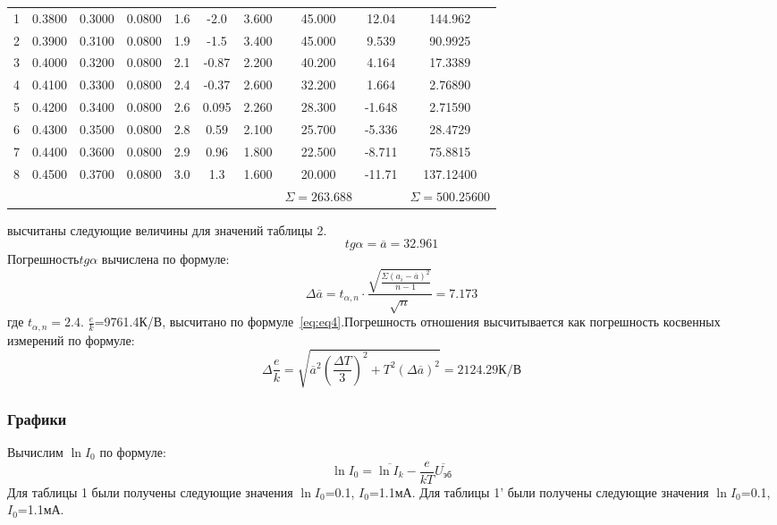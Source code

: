 \begin{center}
\begin{table}[H]
\begin{tabular}{|c|c|c|c|c|c|c|c|c|c|}
\begin{minipage}{21mm}
\end{minipage}\\
\hline
1 &  0.3800  &  0.3000  & 0.0800 & 1.6& -2.0&3.600 & 45.000 &12.04 & 144.962\\
2 &  0.3900  &  0.3100  &  0.0800 & 1.9& -1.5&3.400 &45.000 &9.539 &90.9925\\
3 &  0.4000  &  0.3200  & 0.0800  & 2.1& -0.87&2.200 &40.200 &4.164 &17.3389\\
4 & 0.4100  &  0.3300 &  0.0800 & 2.4& -0.37&2.600  &32.200 &1.664 &2.76890\\
5 & 0.4200  &  0.3400  &  0.0800 &  2.6&0.095 &2.260 &28.300 &-1.648 &2.71590  \\
6 & 0.4300  &  0.3500  &  0.0800 & 2.8&0.59 &2.100 &25.700 &-5.336 &28.4729 \\
7 & 0.4400  &  0.3600  &  0.0800 & 2.9&0.96 &1.800 &22.500 &-8.711 & 75.8815 \\
8 & 0.4500  &  0.3700  &  0.0800 & 3.0& 1.3 &1.600 &20.000 &-11.71 &137.12400  \\
 &   &    &   & &  & & $\Sigma=263.688$& & $\Sigma=500.25600$ \\

\hline
\end{tabular}
\end{table}
\end{center}
 высчитаны следующие величины для значений таблицы 2.
\begin{equation}
    tg{\alpha}=\overline{a}=32.961
\end{equation}
Погрешность$tg{\alpha}$ вычислена по формуле:
\begin{equation}
    \Delta\overline{a}=t_{\alpha,n}\cdot\frac{\sqrt{\frac{\Sigma(a_i-\overline{a})^2}{{n-1}}}}{\sqrt{n}}=7.173
\end{equation}
где $t_{\alpha,n}=2.4$.
 $\frac{e}{k}$=9761.4К/В, высчитано по формуле~\ref{eq:eq4}.Погрешность отношения высчитывается как погрешность косвенных измерений по формуле:
\begin{equation}
    \Delta\frac{e}{k}=\sqrt{\overline{a}^2(\frac{\Delta T}{3})^2+T^2(\Delta\overline{a})^2}=2124.29 \text{К/В}
\end{equation}



\subsubsection{Графики}
Вычислим $\ln I_0$ по формуле:
\begin{equation}
    \ln I_0=\overline{\ln I_k}-\frac{e}{kT}\overline{U_{\text{эб}}}
\end{equation}
Для таблицы 1 были получены следующие значения $\ln I_0$=0.1, $I_0$=1.1мА.
Для таблицы 1' были получены следующие значения $\ln I_0$=0.1, $I_0$=1.1мА.


